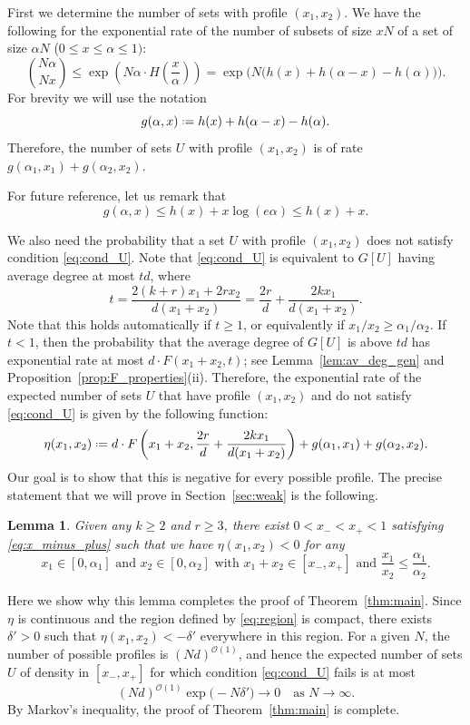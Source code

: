 \documentclass[12pt]{amsart}
\newtheorem{lemma}[theorem]{Lemma}
\theoremstyle{definition}
\newcommand\Oc{\mathcal{O}}  %
\newcommand\al{\alpha}
\newcommand\de{\delta}
\newcommand{\defeq}{\mathrel{\vcenter{\baselineskip0.5ex \lineskiplimit0pt
                     \hbox{\scriptsize.}\hbox{\scriptsize.}}}%
                     =}
\begin{document}
First we determine the number of sets with profile $(x_1,x_2)$. We have the following for the exponential rate of the number of subsets of size $xN$ of a set of size $\al N$ ($0 \leq x \leq \al \leq 1)$:
%
\[ \binom{N\al}{Nx} 
\leq \exp\left( N\al \cdot H\left( \frac{x}{\al} \right) \right)
= \exp\bigg( N \big( h(x)+h(\al-x)-h(\al) \big) \bigg) .\] 
%
For brevity we will use the notation 
%
\[ g(\al,x) \defeq h(x)+h(\al-x)-h(\al) .\]
%
Therefore, the number of sets $U$ with profile $(x_1,x_2)$ is of rate $g(\al_1,x_1)+g(\al_2,x_2)$.

For future reference, let us remark that 
%
\begin{equation} \label{eq:g_bound}
g(\al,x) \leq h(x) + x \log(e \al) \leq h(x) + x .
\end{equation}
%

We also need the probability that a set $U$ with profile $(x_1,x_2)$ does not satisfy condition \eqref{eq:cond_U}. Note that \eqref{eq:cond_U} is equivalent to $G[U]$ having average degree at most $td$, where
%
\[ t= \frac{2(k+r) x_1 + 2r x_2}{d(x_1+x_2)} 
= \frac{2r}{d} + \frac{2k x_1}{d(x_1+x_2)} .\]
%
Note that this holds automatically if $t \geq 1$, or equivalently if $x_1/x_2 \geq \al_1/\al_2$. If $t<1$, then the probability that the average degree of $G[U]$ is above $td$ has exponential rate at most $d \cdot F(x_1+x_2,t)$; see Lemma~\ref{lem:av_deg_gen} and Proposition~\ref{prop:F_properties}(ii). Therefore, the exponential rate of the expected number of sets $U$ that have profile $(x_1,x_2)$ and do not satisfy \eqref{eq:cond_U} is given by the following function: 
%
\begin{equation} \label{eq:eta}
\eta(x_1,x_2) \defeq d \cdot F\left( x_1+x_2, 
\frac{2r}{d} + \frac{2k x_1}{d(x_1+x_2)} \right)+g(\al_1,x_1)+g(\al_2,x_2) .
\end{equation}
%
Our goal is to show that this is negative for every possible profile. The precise statement that we will prove in Section~\ref{sec:weak} is the following.
%
\begin{lemma} \label{lem:profile}
Given any $k \geq 2$ and $r\geq 3$, there exist $0<x_-<x_+<1$ satisfying \eqref{eq:x_minus_plus} such that we have $\eta(x_1,x_2)<0$ for any 
%
\begin{equation} \label{eq:region}
x_1 \in [0,\al_1] \text{ and }
x_2 \in [0,\al_2] \text{ with }
x_1+x_2 \in [x_-,x_+] \text{ and } 
\frac{x_1}{x_2} \leq \frac{\al_1}{\al_2} .
\end{equation}
% 
\end{lemma}
%
Here we show why this lemma completes the proof of Theorem~\ref{thm:main}. Since $\eta$ is continuous and the region defined by \eqref{eq:region} is compact, there exists $\de'>0$ such that $\eta(x_1,x_2) < - \de'$ everywhere in this region. For a given $N$, the number of possible profiles is $(Nd)^{\Oc(1)}$, and hence the expected number of sets $U$ of density in $[x_-,x_+]$ for which condition \eqref{eq:cond_U} fails is at most 
%
\[ (Nd)^{\Oc(1)} \exp\big( -N \de' \big) \to 0 
\quad \text{as } N \to \infty .\]
%
By Markov’s inequality, the proof of Theorem~\ref{thm:main} is complete.
\end{document}
